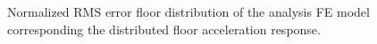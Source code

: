 \begin{figure}[!ht]
\centering
{}
\caption{Normalized RMS error floor distribution of the analysis FE model corresponding the distributed floor acceleration response.}
\label{fig:7-16}
\end{figure}

